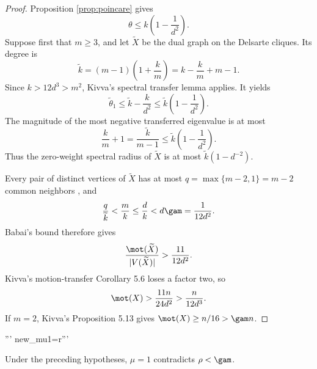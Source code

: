 \begin{proof}
Proposition \ref{prop:poincare} gives
\[
 \theta\le k\left(1-\frac1{d^2}\right).
\]
Suppose first that $m\ge3$, and let $\widetilde X$ be the dual graph on the Delsarte cliques.  Its degree is
\[
 \widetilde k=(m-1)\left(1+\frac{k}{m}\right)
 =k-\frac{k}{m}+m-1.
\]
Since $k>12d^3>m^2$, Kivva's spectral transfer lemma \cite[Lemma 2.27]{Kivva} applies.  It yields
\[
 \widetilde\theta_1\le\widetilde k-\frac{k}{d^2}
 \le\widetilde k\left(1-\frac1{d^2}\right).
\]
The magnitude of the most negative transferred eigenvalue is at most
\[
 \frac{k}{m}+1=\frac{\widetilde k}{m-1}
 \le\widetilde k\left(1-\frac1{d^2}\right).
\]
Thus the zero-weight spectral radius of $\widetilde X$ is at most
$\widetilde k(1-d^{-2})$.

Every pair of distinct vertices of $\widetilde X$ has at most
$q=\max\{m-2,1\}=m-2$ common neighbors \cite[Section 5.1]{Kivva}, and
\[
 \frac{q}{\widetilde k}<\frac{m}{k}\le\frac{d}{k}
 <d\gam=\frac1{12d^2}.
\]
Babai's bound therefore gives
\[
 \frac{\mot(\widetilde X)}{|V(\widetilde X)|}
 >\frac{11}{12d^2}.
\]
Kivva's motion-transfer Corollary 5.6 loses a factor two, so
\[
 \mot(X)>\frac{11n}{24d^2}>\frac{n}{12d^3}.
\]
If $m=2$, Kivva's Proposition 5.13 gives $\mot(X)\ge n/16>\gam n$.
\end{proof}'''
new_mu1=r'''\begin{proposition}[The case $\mu=1$]\label{prop:mu1}
Under the preceding hypotheses, $\mu=1$ contradicts $\rho<\gam$.
\end{proposition}

